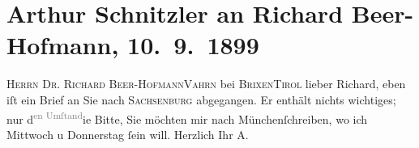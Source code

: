 

         
         \renewcommand{\erwaehntePersonen}{Personen: Richard Beer-Hofmann}
         \renewcommand{\erwaehnteOrte}{Orte: Bad Ischl, Brixen, München, Sachsenburg, Tirol, Vahrn}
         \renewcommand{\erwaehnteWerke}{}
               \section[Arthur Schnitzler an Richard Beer-Hofmann, 10. 9. 1899]{ Arthur Schnitzler an Richard Beer-Hofmann, 10. 9. 1899}\nopagebreak{}\rehead{ }\begin{ledgroupsized}[t]{13cm}\normalsize\beginnumbering \toendnotes[C]{\smallbreak\pagebreak[2]} 
\pstart{}{\pb}\textsc{Herrn Dr.
                  Richard Beer-Hofmann}\pend{}\pstart{}\textsc{Vahrn} bei \textsc{Brixen}\pend{}\pstart{}\textsc{Tirol}\pend{}{\bigskip}\pstart
           \noindent{}{\pb}lieber Richard, eben iſt ein
               Brief an Sie nach \textsc{Sachsenburg} abgegangen. Er enthält nichts wichtiges; nur d\substVorne{}\textsuperscript{\textcolor{gray}{en Umſtand}}{\allowbreak}\substDazwischen{}ie Bitte\substHinten{}, Sie möchten mir nach Münchenſchreiben,
               wo ich Mittwoch u Donnerstag{ }ſein will.\pend
           \pstart Herzlich Ihr \spacefill\mbox{A.}\pend{}
         
         \endnumbering{}\end{ledgroupsized}  \newcommand{\dateiname}{L00972}\newcommand{\titel}{Arthur Schnitzler an Richard Beer-Hofmann, 10. 9. 1899}\newcommand{\editorInnen}{Martin Anton Müller und Gerd-Hermann Susen}
      
